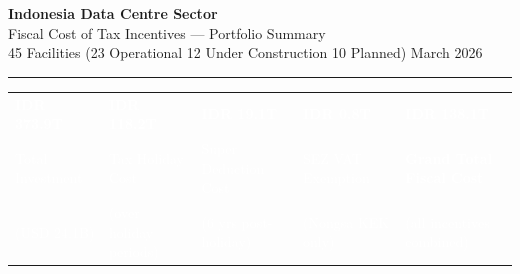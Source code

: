 \documentclass[a4paper,10pt]{article}
\begin{document}

{\centering
  {\LARGE\bfseries\color{navy} Indonesia Data Centre Sector}\\[3pt]
  {\large\color{teal} Fiscal Cost of Tax Incentives --- Portfolio Summary}\\[2pt]
  {\small\color{midgray} 45 Facilities (23 Operational \textbar{} 12 Under Construction \textbar{} 10 Planned) \textbar{} March 2026}\\[6pt]
}

\noindent\color{navy}\rule{\linewidth}{1.5pt}

\vspace{8pt}

\noindent
\begin{tabularx}{\linewidth}{>{\centering\arraybackslash}X>{\centering\arraybackslash}X>{\centering\arraybackslash}X>{\centering\arraybackslash}X>{\centering\arraybackslash}X}
  \cellcolor{kpibg}\textcolor{white}{\textbf{\large IDR 373.9T}} &
  \cellcolor{kpibg}\textcolor{white}{\textbf{\large IDR 118.2T}} &
  \cellcolor{kpibg}\textcolor{white}{\textbf{\large IDR 19.1T}}  &
  \cellcolor{kpibg}\textcolor{white}{\textbf{\large IDR 0.8T}}   &
  \cellcolor{alertred}\textcolor{white}{\textbf{\large IDR 138.1T}} \\
  \cellcolor{kpibg}\textcolor{white}{\scriptsize Total Investment} &
  \cellcolor{kpibg}\textcolor{white}{\scriptsize Tax Holiday Cost} &
  \cellcolor{kpibg}\textcolor{white}{\scriptsize Super Deduction Cost} &
  \cellcolor{kpibg}\textcolor{white}{\scriptsize SEZ VAT Exemption} &
  \cellcolor{alertred}\textcolor{white}{\scriptsize \textbf{Grand Total Fiscal Cost}} \\
  \cellcolor{kpibg}\textcolor{white}{\scriptsize (USD 24.1B)} &
  \cellcolor{kpibg}\textcolor{white}{\scriptsize (over holiday periods)} &
  \cellcolor{kpibg}\textcolor{white}{\scriptsize (6 yrs post-holiday)} &
  \cellcolor{kpibg}\textcolor{white}{\scriptsize (Nongsa KEK only)} &
  \cellcolor{alertred}\textcolor{white}{\scriptsize (all incentives combined)}\\
\end{tabularx}

\vspace{10pt}

\end{document}
